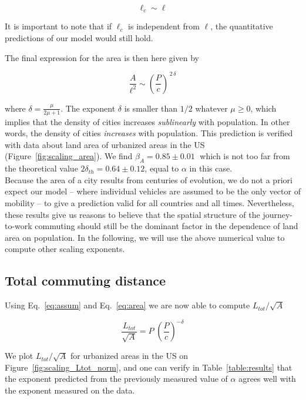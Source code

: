 \begin{equation}
    \ell_c \sim \ell
\end{equation}

It is important to note that if $\ell_c$ is independent from $\ell$, the
quantitative predictions of our model would still hold. 

The final expression for the area is then here given by

\begin{equation}
    \frac{A}{\ell^2} \sim \left( \frac{P}{c} \right)^{\,2\,\delta}
    \label{eq:area}
\end{equation}

where $\delta=\frac{\mu}{2\mu+1}$. The exponent $\delta$ is smaller than $1/2$
whatever $\mu\geq 0$, which implies that the density of cities increases
\emph{sublinearly} with population. In other words, the density of cities
\emph{increases}  with population. This prediction is verified with data about
land area of urbanized areas in the US (Figure~\ref{fig:scaling_area}). We find
$\beta_A = 0.85 \pm 0.01\;$ which is not too far from the
theoretical value $2\delta_{th} = 0.64 \pm 0.12$, equal to
$\alpha$ in this case.\\

Because the area of a city results from centuries of evolution, we do
not a priori expect our model -- where individual vehicles are assumed to be the
only vector of mobility -- to give a prediction valid for all countries and all
times. Nevertheless, these results give us reasons to believe that the spatial
structure of the journey-to-work commuting should still be the dominant factor
in the dependence of land area on population. In the following, we will use the
above numerical value to compute other scaling exponents.


\subsection{Total commuting distance}

Using Eq.~\ref{eq:assum} and Eq.~\ref{eq:area} we are now able to compute $L_{tot}/\sqrt{A}$

\begin{equation}
    \frac{L_{tot}}{\sqrt{A}} = P\; \left(\frac{P}{c}\right)^{-\delta}
    \label{eq:travelled_length}
\end{equation}

We plot $L_{tot} / \sqrt{A}$ for urbanized areas in the US on
Figure~\ref{fig:scaling_Ltot_norm}, and one
can verify in Table~\ref{table:results} that the exponent predicted from the previously measured
value of $\alpha$ agrees well with the exponent measured on the data.


